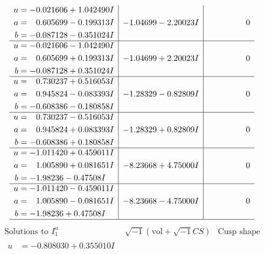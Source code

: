 \documentclass[1p]{elsarticle_modified}
\theoremstyle{definition}
\newcommand{\I}{\sqrt{-1}}
\begin{document}
$$\begin{array}{c|c|c}
\begin{aligned}
u &= -0.021606 + 1.042490 I \\
a &= \phantom{-}0.605699 - 0.199313 I \\
b &= -0.087128 - 0.351024 I\end{aligned}
 & -1.04699 - 2.20023 I & \phantom{-0.000000 } 0 \\ \hline\begin{aligned}
u &= -0.021606 - 1.042490 I \\
a &= \phantom{-}0.605699 + 0.199313 I \\
b &= -0.087128 + 0.351024 I\end{aligned}
 & -1.04699 + 2.20023 I & \phantom{-0.000000 } 0 \\ \hline\begin{aligned}
u &= \phantom{-}0.730237 + 0.516053 I \\
a &= \phantom{-}0.945824 - 0.083393 I \\
b &= -0.608386 - 0.180858 I\end{aligned}
 & -1.28329 - 0.82809 I & \phantom{-0.000000 } 0 \\ \hline\begin{aligned}
u &= \phantom{-}0.730237 - 0.516053 I \\
a &= \phantom{-}0.945824 + 0.083393 I \\
b &= -0.608386 + 0.180858 I\end{aligned}
 & -1.28329 + 0.82809 I & \phantom{-0.000000 } 0 \\ \hline\begin{aligned}
u &= -1.011420 + 0.459011 I \\
a &= \phantom{-}1.005890 + 0.081651 I \\
b &= -1.98236 - 0.47508 I\end{aligned}
 & -8.23668 + 4.75000 I & \phantom{-0.000000 } 0 \\ \hline\begin{aligned}
u &= -1.011420 - 0.459011 I \\
a &= \phantom{-}1.005890 - 0.081651 I \\
b &= -1.98236 + 0.47508 I\end{aligned}
 & -8.23668 - 4.75000 I & \phantom{-0.000000 } 0\\
 \hline 
 \end{array}$$\newpage$$\begin{array}{c|c|c}  
\text{Solutions to }I^u_{1}& \I (\text{vol} + \sqrt{-1}CS) & \text{Cusp shape}\\
 \hline 
\begin{aligned}
u &= -0.808030 + 0.355010 I \\

\end{aligned}
\end{array}$$
\end{document}
